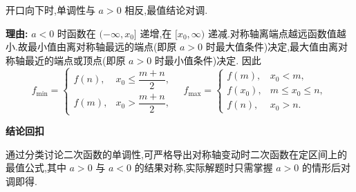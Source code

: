 \begin{proofbox}
\begin{description}[style=nextline, leftmargin=2.8em, labelsep=0.5em, itemsep=0.55em]
		\item[\textbf{步骤四($a<0$ 情形):}] 开口向下时,单调性与 $a>0$ 相反,最值结论对调.
			\par\textbf{理由:}
			$a<0$ 时函数在 $(-\infty,x_0]$ 递增,在 $[x_0,\infty)$ 递减.对称轴离端点越远函数值越小.故最小值由离对称轴最远的端点(即原 $a>0$ 时最大值条件)决定,最大值由离对称轴最近的端点或顶点(即原 $a>0$ 时最小值条件)决定.
			因此
			\[
				f_{\min}=
				\begin{cases}
					f(n), & x_0\le\dfrac{m+n}{2},\\[6pt]
					f(m), & x_0>\dfrac{m+n}{2},
			\end{cases}
				\quad
				f_{\max}=
				\begin{cases}
					f(m), & x_0<m,\\
					f(x_0), & m\le x_0\le n,\\
					f(n), & x_0>n.
			\end{cases}
			\]
	\end{description}

	\medskip
	\textbf{\textcolor{CProof}{结论回扣}}

	通过分类讨论二次函数的单调性,可严格导出对称轴变动时二次函数在定区间上的最值公式,其中 $a>0$ 与 $a<0$ 的结果对称,实际解题时只需掌握 $a>0$ 的情形后对调即得.
\end{proofbox}
